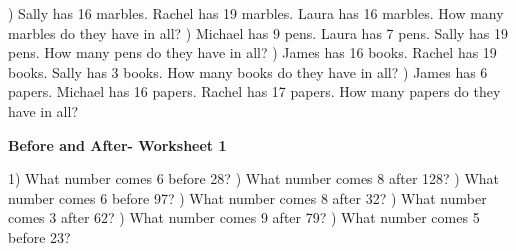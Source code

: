 \documentclass{article}%
\begin{document}
\newline%
) Sally has 16 marbles. Rachel has 19 marbles. Laura has 16 marbles. How many marbles do they have in all?%
\newline%
\newline%
) Michael has 9 pens. Laura has 7 pens. Sally has 19 pens. How many pens do they have in all?%
\newline%
\newline%
) James has 16 books. Rachel has 19 books. Sally has 3 books. How many books do they have in all?%
\newline%
\newline%
) James has 6 papers. Michael has 16 papers. Rachel has 17 papers. How many papers do they have in all?%
\newline%
\newline%
\newline%
\pagebreak%
\large%
\begin{center}%
\textbf{Before and After- Worksheet 1}%
\newline%
\end{center} \normalsize%
1) What number comes 6 before 28?%
\newline%
\newline%
) What number comes 8 after 128?%
\newline%
\newline%
) What number comes 6 before 97?%
\newline%
\newline%
) What number comes 8 after 32?%
\newline%
\newline%
) What number comes 3 after 62?%
\newline%
\newline%
) What number comes 9 after 79?%
\newline%
\newline%
) What number comes 5 before 23?%
\newline%
\newline%
\newline%
\end{document}
